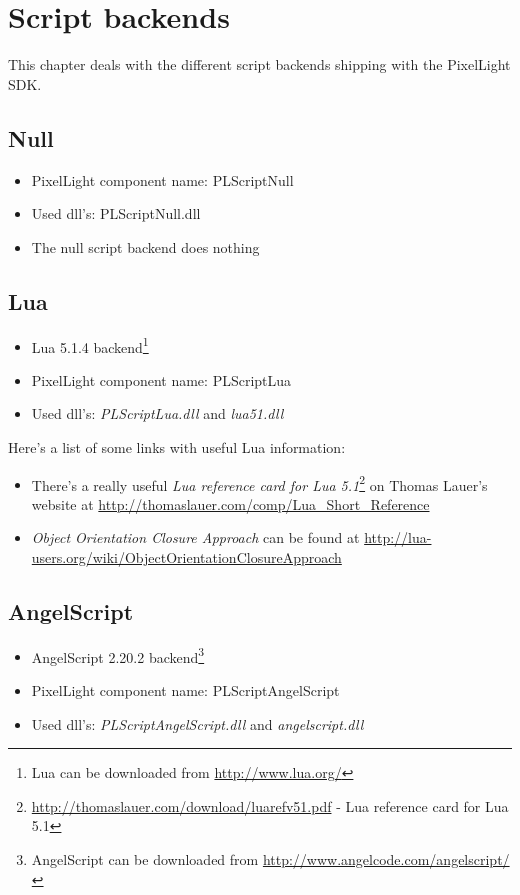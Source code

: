 \chapter{Script backends}
This chapter deals with the different script backends shipping with the PixelLight SDK.




\section{Null}
\begin{itemize}
\item PixelLight component name: PLScriptNull
\item Used dll's: PLScriptNull.dll
\item The null script backend does nothing
\end{itemize}




\section{Lua}
\begin{itemize}
\item Lua 5.1.4 backend\footnote{Lua can be downloaded from \url{http://www.lua.org/}}
\item PixelLight component name: PLScriptLua
\item Used dll's: \emph{PLScriptLua.dll} and \emph{lua51.dll}
\end{itemize}

Here's a list of some links with useful Lua information:
\begin{itemize}
\item There's a really useful \emph{Lua reference card for Lua 5.1}\footnote{\url{http://thomaslauer.com/download/luarefv51.pdf} - Lua reference card for Lua 5.1} on Thomas Lauer's website at \url{http://thomaslauer.com/comp/Lua_Short_Reference}
\item \emph{Object Orientation Closure Approach} can be found at \url{http://lua-users.org/wiki/ObjectOrientationClosureApproach}
\end{itemize}




\section{AngelScript}
\begin{itemize}
\item AngelScript 2.20.2 backend\footnote{AngelScript can be downloaded from \url{http://www.angelcode.com/angelscript/}}
\item PixelLight component name: PLScriptAngelScript
\item Used dll's: \emph{PLScriptAngelScript.dll} and \emph{angelscript.dll}
\end{itemize}

